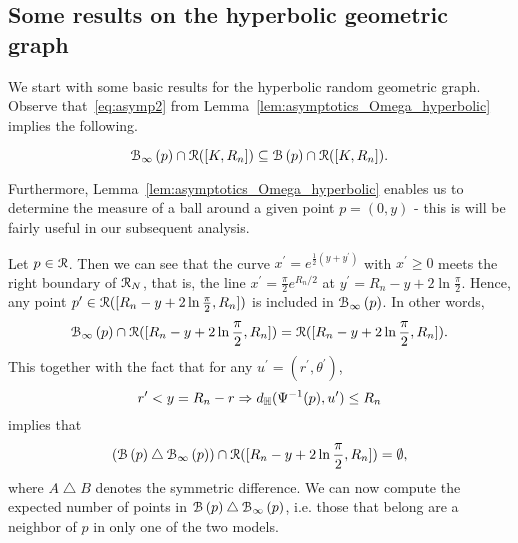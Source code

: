 
\subsection{Some results on the hyperbolic geometric graph}

We start with some basic results for the hyperbolic random geometric graph. Observe that~\eqref{eq:asymp2} from Lemma~\ref{lem:asymptotics_Omega_hyperbolic} implies the following. 
\begin{corollary}\label{cor:balls_inclusion}
\begin{equation*}
 {\mathcal B}_{\infty}\left(p\right) \cap {\mathcal R} ([K,R_n]) \subseteq {\mathcal B}\left(p\right) \cap {\mathcal R} ([K,R_n]). 
\end{equation*}
\end{corollary}


Furthermore, Lemma~\ref{lem:asymptotics_Omega_hyperbolic} enables us to determine the measure of a ball around a given point $p=(0,y)$ - this is will be fairly useful in our subsequent analysis. 

Let $p \in {\mathcal R}$. Then we can see that the curve $x^\prime = e^{\frac{1}{2} (y + y^\prime)}$ with $x^\prime \geq 0$ meets the right boundary of ${\mathcal R}_N$, that is, the line $x^\prime = \frac{\pi}{2} e^{R_n/2}$ at $y^\prime = R_n - y + 2\ln \frac{\pi}{2}$. Hence, any point $p^{\prime} \in {\mathcal R} ([R_n - y + 2\ln \frac{\pi}{2}, R_n])$ is included in ${\mathcal B}_{\infty}\left(p\right)$. In other words,
\begin{equation*} \label{eq:P_ball_inclusion_lower}
{\mathcal B}_{\infty}\left(p\right) \cap {\mathcal R} ([R_n - y +2\ln \frac{\pi}{2},R_n]) = {\mathcal R} ([R_n - y + 2\ln \frac{\pi}{2},R_n]).
\end{equation*}
This together with the fact that for any $u^\prime = (r^\prime, \theta^\prime)$,
\[
	r^\prime < y = R_n -r \Rightarrow d_{\mathbb{H}}(\Psi^{-1}(p),u^\prime) \le R_n
\]
implies that 
\begin{equation}\label{eq:symm_diff_upper_P} 
({\mathcal B}\left(p\right) \bigtriangleup {\mathcal B}_{\infty}\left(p\right))  \cap {\mathcal R} ([R_n - y + 2 \ln \frac{\pi}{2},R_n]) = \emptyset,
\end{equation}
where $A \bigtriangleup B$ denotes the symmetric difference. We can now compute the expected number of points in ${\mathcal B}\left(p\right) \bigtriangleup {\mathcal B}_{\infty}\left(p\right)$, i.e. those that belong are a neighbor of $p$ in only one of the two models.


